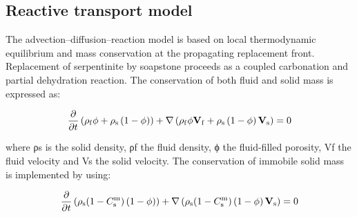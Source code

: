 \subsection*{Reactive transport model}

The advection–diffusion–reaction model is based on local thermodynamic equilibrium and mass conservation at the propagating replacement front. Replacement of serpentinite by soapstone proceeds as a coupled carbonation and partial dehydration reaction. The conservation of both fluid and solid mass is expressed as:

\begin{equation}
	\frac{\partial }{{\partial t}}\left( {\rho _{\rm{f}}\phi + \rho _{\rm{s}}\left( {1 - \phi } \right)} \right) + \nabla \left( {\rho _{\rm{f}}\phi {\bf{V}}_{\rm{f}} + \rho _{\rm{s}}\left( {1 - \phi } \right){\bf{V}}_{\rm{s}}} \right) = 0
	\label{eq:eq2}
\end{equation}

\noindent where ρs is the solid density, ρf the fluid density, ϕ the fluid-filled porosity, Vf the fluid velocity and Vs the solid velocity. The conservation of immobile solid mass is implemented by using:

\begin{equation}
	\frac{\partial }{{\partial t}}\left( {\rho _{\rm{s}}(1 - C_{\rm{s}}^{\rm{m}})\left( {1 - \phi } \right)} \right) + \nabla \left( {\rho _{\rm{s}}(1 - C_{\rm{s}}^{\rm{m}})\left( {1 - \phi } \right){\bf{V}}_{\rm{s}}} \right) = 0
	\label{eq:eq2}
\end{equation}